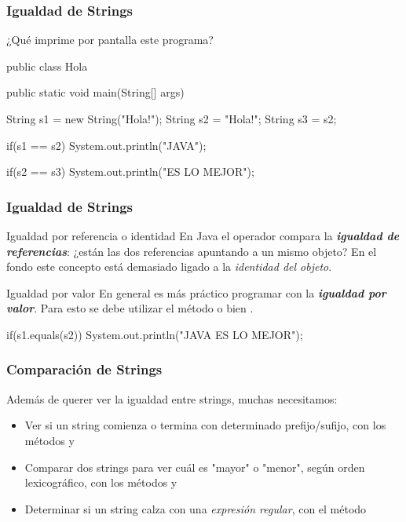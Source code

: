 \documentclass{beamer}
\begin{document}
\begin{frame}[fragile]
  \frametitle{Igualdad de Strings}

  ¿Qué imprime por pantalla este programa?

  \begin{jsmall}
    public class Hola {
      public static void main(String[] args) {
        String s1 = new String("Hola!");
        String s2 = "Hola!";
        String s3 = s2;

        if(s1 == s2) {
          System.out.println("JAVA");
        }

        if(s2 == s3) {
          System.out.println("ES LO MEJOR");
        }
      }
    }    
  \end{jsmall}  
\end{frame}

\begin{frame}[fragile]
  \frametitle{Igualdad de Strings}

  \begin{block}{Igualdad por referencia o identidad}
    En Java el operador \codet{==} compara la \textbf{\textit{igualdad
        de referencias}}: ¿están las dos referencias apuntando a un
    mismo objeto? En el fondo este concepto está demasiado ligado a la
    \emph{identidad del objeto}.
  \end{block}

  \begin{block}{Igualdad por valor}
    En general es más práctico programar con la
    \textbf{\textit{igualdad por valor}}. Para esto se debe utilizar
    el método  o bien .
  \end{block}

  \begin{jsmall}
    if(s1.equals(s2)) {
      System.out.println("JAVA ES LO MEJOR");
    }
  \end{jsmall}  
  
\end{frame}

\begin{frame}
  \frametitle{Comparación de Strings}

  Además de querer ver la igualdad entre strings, muchas necesitamos:

  \begin{itemize}
  \item Ver si un string comienza o termina con determinado
    prefijo/sufijo, con los métodos  y
    
  \item Comparar dos strings para ver cuál es "mayor" o "menor", según
    orden lexicográfico, con los métodos  y
    
  \item Determinar si un string calza con una \emph{expresión
      regular}, con el método 
  \end{itemize}
  
\end{frame}
\end{document}
